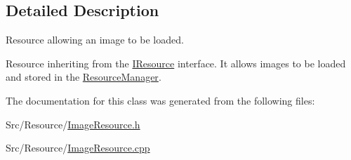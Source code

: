 \subsection{Detailed Description}
Resource allowing an image to be loaded. 

Resource inheriting from the \hyperlink{classIResource}{I\-Resource} interface. It allows images to be loaded and stored in the \hyperlink{classResourceManager}{Resource\-Manager}. 

The documentation for this class was generated from the following files\-:\begin{DoxyCompactItemize}
\item 
Src/\-Resource/\hyperlink{ImageResource_8h}{Image\-Resource.\-h}\item 
Src/\-Resource/\hyperlink{ImageResource_8cpp}{Image\-Resource.\-cpp}\end{DoxyCompactItemize}
